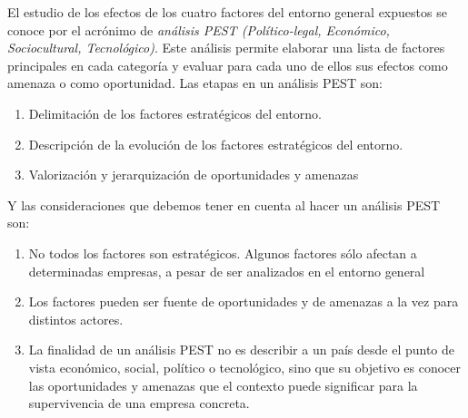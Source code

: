 \documentclass[10pt,a4paper,spanish]{report}
\begin{document}
            El estudio de los efectos de los cuatro factores del entorno general expuestos se conoce por el acrónimo de \textit{\textcolor[rgb]{0.3,0.4,0.6}{análisis PEST (Político-legal, Económico, Sociocultural, Tecnológico)}}. Este análisis permite elaborar una lista de factores principales en cada categoría y evaluar para cada uno de ellos sus efectos como amenaza o como oportunidad.
            Las etapas en un análisis PEST son:
            \begin{enumerate}[1.]
                  \item Delimitación de los factores estratégicos del entorno.
                  \item Descripción de la evolución de los factores estratégicos del entorno.
                  \item Valorización y jerarquización de oportunidades y amenazas
            \end{enumerate}
            Y las consideraciones que debemos tener en cuenta al hacer un análisis PEST son:
            \begin{enumerate}
                  \item No todos los factores son estratégicos. Algunos factores sólo afectan a determinadas empresas, a pesar de ser analizados en el entorno general
                  \item Los factores pueden ser fuente de oportunidades y de amenazas a la vez para distintos actores.
                  \item La finalidad de un análisis PEST no es describir a un país desde el punto de vista económico, social, político o tecnológico, sino que su objetivo es conocer las oportunidades y amenazas que el contexto puede significar para la supervivencia de una empresa concreta.
            \end{enumerate}
\end{document}
